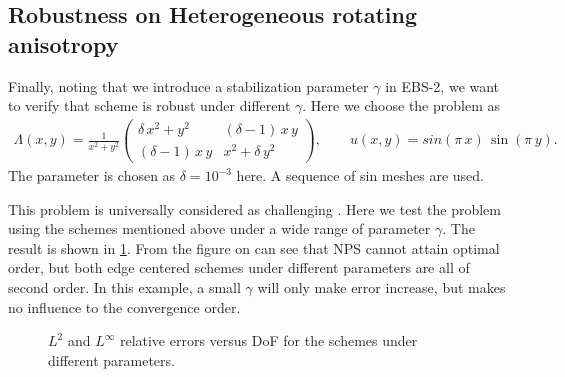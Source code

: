 \documentclass[times,review,preprint,authoryear]{elsarticle}
\begin{document}
\subsection{Robustness on Heterogeneous rotating anisotropy}

Finally, noting that we introduce a stabilization parameter $\gamma$ in EBS-2, we want to verify that scheme is robust under different $\gamma$. Here we choose the problem as
\begin{align*}
\Lambda(x,y) = 
\frac{1}{x^2 + y^2}
\left(
\begin{matrix}
\delta \, x^2 + y^2 & (\delta-1) \, x \, y \\
(\delta-1) \, x \, y  & x^2 + \delta \, y^2
\end{matrix}
\right),
\qquad
u(x,y) = sin(\pi \, x) \, \sin(\pi \, y).
\end{align*}
The parameter is chosen as $\delta = 10^{-3}$ here. A sequence of sin meshes are used.

This problem is universally considered as challenging \cite{???}. Here we test the problem using the schemes mentioned above under a wide range of parameter $\gamma$. The result is shown in \cref{fig:error}. From the figure on can see that NPS cannot attain optimal order, but both edge centered schemes under different parameters are all of second order. In this example, a small $\gamma$ will only make error increase, but makes no influence to the convergence order.

\begin{figure}[h]
\centering
{}
\caption{$L^2$ and $L^\infty$ relative errors versus DoF for the schemes under different parameters.}
\label{fig:error}
\end{figure}
\end{document}
